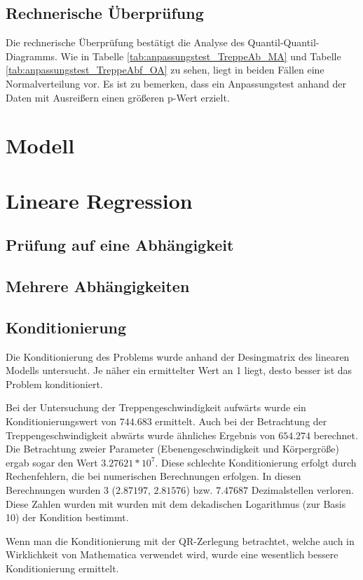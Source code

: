 	
	
	
	\subsection{Rechnerische Überprüfung}
	Die rechnerische Überprüfung bestätigt die Analyse des Quantil-Quantil-Diagramms. Wie in Tabelle \ref{tab:anpassungstest_TreppeAb_MA} und Tabelle \ref{tab:anpassungstest_TreppeAbf_OA} zu sehen, liegt in beiden Fällen eine Normalverteilung vor. Es ist zu bemerken, dass ein Anpassungstest anhand der Daten mit Ausreißern einen größeren p-Wert erzielt. 
	
	
	\section{Modell}
	\section{Lineare Regression}
	\subsection{Prüfung auf eine Abhängigkeit}
	\subsection{Mehrere Abhängigkeiten}
	\subsection{Konditionierung}
	Die Konditionierung des Problems wurde anhand der Desingmatrix des linearen Modells untersucht. Je näher ein ermittelter Wert an 1 liegt, desto besser ist das Problem konditioniert.
	
	Bei der Untersuchung der Treppengeschwindigkeit aufwärts wurde ein Konditionierungswert von $744.683$ ermittelt. Auch bei der Betrachtung der Treppengeschwindigkeit abwärts wurde ähnliches Ergebnis von $654.274$ berechnet. Die Betrachtung zweier Parameter (Ebenengeschwindigkeit und Körpergröße) ergab sogar den Wert $3.27621*10^7$.
	Diese schlechte Konditionierung erfolgt durch Rechenfehlern, die bei numerischen Berechnungen erfolgen. In diesen Berechnungen wurden 3 ($2.87197$, $2.81576$) bzw. $7.47687$ Dezimalstellen verloren. Diese Zahlen wurden mit wurden mit dem dekadischen Logarithmus (zur Basis 10) der Kondition bestimmt.
	
	Wenn man die Konditionierung mit der QR-Zerlegung betrachtet, welche auch in Wirklichkeit von Mathematica verwendet wird, wurde eine wesentlich bessere Konditionierung ermittelt.
	
